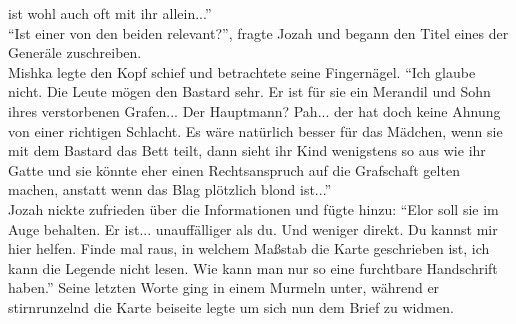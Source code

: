 ist wohl auch oft mit ihr allein...''\\
``Ist einer von den beiden relevant?'', fragte Jozah und begann den Titel eines der Generäle 
zuschreiben.\\
Mishka legte den Kopf schief und betrachtete seine Fingernägel. ``Ich glaube nicht. Die Leute mögen 
den Bastard sehr. Er ist für sie ein Merandil und Sohn ihres verstorbenen Grafen... Der Hauptmann? 
Pah... der hat doch keine Ahnung von einer richtigen Schlacht. Es wäre natürlich besser für das 
Mädchen, wenn sie mit dem Bastard das Bett teilt, dann sieht ihr Kind wenigstens so aus wie ihr 
Gatte und sie könnte eher einen Rechtsanspruch auf die Grafschaft gelten machen, anstatt wenn das 
Blag plötzlich blond ist...''\\
Jozah nickte zufrieden über die Informationen und fügte hinzu: ``Elor soll sie im Auge behalten. Er 
ist... unauffälliger als du. Und weniger direkt. Du kannst mir hier helfen. Finde mal raus, in 
welchem Maßstab die Karte geschrieben ist, ich kann die Legende nicht lesen. Wie kann man nur so 
eine furchtbare Handschrift haben.'' Seine letzten Worte ging in einem Murmeln unter, während er 
stirnrunzelnd die Karte beiseite legte um sich nun dem Brief zu widmen.\\


